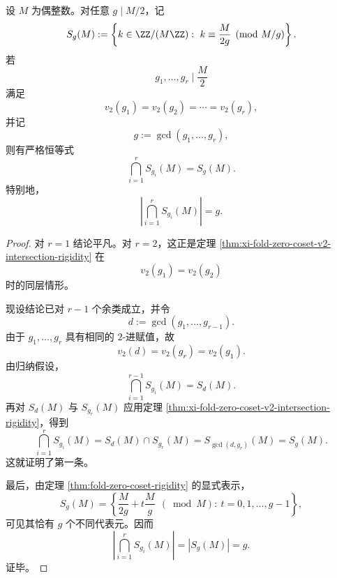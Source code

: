 \begin{theorem}\label{thm:conclusion-zero-coset-fixed-v2-finite-intersection-gcd}
设 \(M\) 为偶整数。对任意 \(g\mid M/2\)，记
\[
S_g(M):=
\left\{
k\in \ZZ/(M\ZZ):\ k\equiv \frac{M}{2g}\pmod{M/g}
\right\}.
\]
若
\[
g_1,\dots,g_r\mid \frac{M}{2}
\]
满足
\[
v_2(g_1)=v_2(g_2)=\cdots=v_2(g_r),
\]
并记
\[
g:=\gcd(g_1,\dots,g_r),
\]
则有严格恒等式
\[
\boxed{\;
\bigcap_{i=1}^{r}S_{g_i}(M)=S_g(M).\;}
\]
特别地，
\[
\boxed{\;
\left|\bigcap_{i=1}^{r}S_{g_i}(M)\right|=g.\;}
\]
\end{theorem}
\begin{proof}
对 \(r=1\) 结论平凡。对 \(r=2\)，这正是定理 \ref{thm:xi-fold-zero-coset-v2-intersection-rigidity} 在
\[
v_2(g_1)=v_2(g_2)
\]
时的同层情形。

现设结论已对 \(r-1\) 个余类成立，并令
\[
d:=\gcd(g_1,\dots,g_{r-1}).
\]
由于 \(g_1,\dots,g_r\) 具有相同的 \(2\)-进赋值，故
\[
v_2(d)=v_2(g_r)=v_2(g_1).
\]
由归纳假设，
\[
\bigcap_{i=1}^{r-1}S_{g_i}(M)=S_d(M).
\]
再对 \(S_d(M)\) 与 \(S_{g_r}(M)\) 应用定理 \ref{thm:xi-fold-zero-coset-v2-intersection-rigidity}，得到
\[
\bigcap_{i=1}^{r}S_{g_i}(M)
=
S_d(M)\cap S_{g_r}(M)
=
S_{\gcd(d,g_r)}(M)
=
S_g(M).
\]
这就证明了第一条。

最后，由定理 \ref{thm:fold-zero-coset-rigidity} 的显式表示，
\[
S_g(M)=
\left\{
\frac{M}{2g}+t\frac{M}{g}\ \ (\bmod M):\ t=0,1,\dots,g-1
\right\},
\]
可见其恰有 \(g\) 个不同代表元。因而
\[
\left|\bigcap_{i=1}^{r}S_{g_i}(M)\right|
=
|S_g(M)|
=
g.
\]
证毕。
\end{proof}

